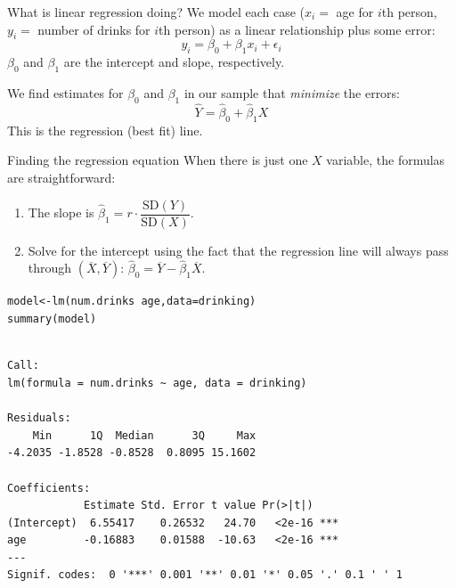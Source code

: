 \documentclass{beamer}\usepackage[]{graphicx}\usepackage[]{color}
\makeatletter
\newcommand{\hlopt}[1]{\textcolor[rgb]{1,0.894,0.769}{#1}}%
\newcommand{\hlstd}[1]{\textcolor[rgb]{1,0.894,0.769}{#1}}%
\newcommand{\hlkwb}[1]{\textcolor[rgb]{0.804,0.776,0.451}{#1}}%
\newcommand{\hlkwc}[1]{\textcolor[rgb]{0.78,0.941,0.545}{#1}}%
\newcommand{\hlkwd}[1]{\textcolor[rgb]{1,0.78,0.769}{#1}}%
\newenvironment{kframe}{%
 \def\at@end@of@kframe{}%
 \ifinner\ifhmode%
  \def\at@end@of@kframe{\end{minipage}}%
  \begin{minipage}{\columnwidth}%
 \fi\fi%
 \def\FrameCommand##1{\hskip\@totalleftmargin \hskip-\fboxsep
 \colorbox{shadecolor}{##1}\hskip-\fboxsep
     \hskip-\linewidth \hskip-\@totalleftmargin \hskip\columnwidth}%
 \MakeFramed {\advance\hsize-\width
   \@totalleftmargin\z@ \linewidth\hsize
   \@setminipage}}%
 {\par\unskip\endMakeFramed%
 \at@end@of@kframe}
\newenvironment{knitrout}{}{} %
\makeatother
\begin{document}
\begin{darkframes}
    \begin{frame}{What is linear regression doing?}
      We model each case ($x_i=$ age for $i$th person, $y_i=$ number of drinks for $i$th person) as a linear relationship plus some error:
      \[
        y_i = \beta_0 + \beta_1 x_i + \epsilon_i
      \]
      $\beta_0$ and $\beta_1$ are the intercept and slope, respectively.
      \bigskip\pause

      We find estimates for $\beta_0$ and $\beta_1$ in our sample that \emph{minimize} the errors:
      \[
        \hat Y = \hat\beta_0 + \hat\beta_1 X
      \]
      This is the regression (best fit) line.
    \end{frame}

    \begin{frame}{Finding the regression equation}
      When there is just one $X$ variable, the formulas are straightforward:
      \begin{enumerate}
        \item The slope is $\hat\beta_1 = r \cdot \dfrac{\text{SD}(Y)}{\text{SD}(X)}$.
        \item Solve for the intercept using the fact that the regression line will always pass through $(\overline X,\overline Y)$: $\hat\beta_0 = \overline Y - \hat\beta_1\overline X$.
      \end{enumerate}
    \end{frame}

    \begin{frame}[fragile]
      \fontsize{9}{9}\selectfont
\begin{knitrout}
\color{fgcolor}\begin{kframe}
\begin{alltt}
\hlstd{model} \hlkwb{<-} \hlkwd{lm}\hlstd{(num.drinks} \hlopt{~} \hlstd{age,} \hlkwc{data}\hlstd{=drinking)}
\hlkwd{summary}\hlstd{(model)}
\end{alltt}
\begin{verbatim}

Call:
lm(formula = num.drinks ~ age, data = drinking)

Residuals:
    Min      1Q  Median      3Q     Max 
-4.2035 -1.8528 -0.8528  0.8095 15.1602 

Coefficients:
            Estimate Std. Error t value Pr(>|t|)    
(Intercept)  6.55417    0.26532   24.70   <2e-16 ***
age         -0.16883    0.01588  -10.63   <2e-16 ***
---
Signif. codes:  0 '***' 0.001 '**' 0.01 '*' 0.05 '.' 0.1 ' ' 1


\end{verbatim}
\end{kframe}
\end{knitrout}
\end{frame}
\end{darkframes}
\end{document}
